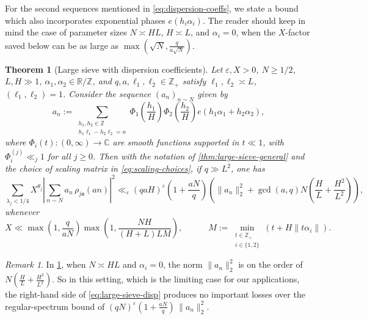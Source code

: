 \documentclass[reqno,11pt]{amsart}
\newtheorem{theorem}{Theorem}%
\theoremstyle{remark}
\newtheorem*{remark}{Remark}
\numberwithin{equation}{section}
\newcommand{\Z}{\mathbb{Z}}
\newcommand{\R}{\mathbb{R}}
\newcommand{\C}{\mathbb{C}}
\newcommand{\ma}{\mathfrak{a}}
\newcommand{\eps}{\varepsilon}
\begin{document}
For the second sequences mentioned in \cref{eq:dispersion-coeffs}, we state a bound which also incorporates exponential phases $e(h_i\alpha_i)$. The reader should keep in mind the case of parameter sizes $N \asymp HL$, $H \asymp L$, and $\alpha_i = 0$, when the $X$-factor saved below can be as large as $\max(\sqrt{N}, \tfrac{q}{a\sqrt{N}})$.




\begin{theorem}[Large sieve with dispersion coefficients] \label{thm:large-sieve-dispersion-coeffs}
Let $\eps, X > 0$, $N \ge 1/2$, $L, H \gg 1$, $\alpha_1, \alpha_2 \in \R/\Z$, and $q, a, \ell_1, \ell_2 \in \Z_+$ satisfy $\ell_1, \ell_2 \asymp L$, $(\ell_1, \ell_2) = 1$. Consider the sequence $(a_n)_{n \sim N}$ given by
\[
    a_n := \sum_{\substack{h_1, h_2 \in \Z \\ h_1 \ell_1 - h_2 \ell_2 = n}} \Phi_1\left(\frac{h_1}{H}\right) \Phi_2\left(\frac{h_2}{H}\right) e(h_1 \alpha_1 + h_2 \alpha_2),
\]
where $\Phi_i(t) : (0, \infty) \to \C$ are smooth functions supported in $t \ll 1$, with $\Phi_i^{(j)} \ll_j 1$ for all $j \ge 0$. Then with the notation of \cref{thm:large-sieve-general} and the choice of scaling matrix in \cref{eq:scaling-choices}, if $q \gg L^2$, one has
\begin{equation} \label{eq:large-sieve-disp}
    \sum_{\lambda_j < 1/4}
    X^{\theta_j} 
    \left\vert 
    \sum_{n \sim N} a_n\, \rho_{j\ma}(an)
    \right\vert^2 
    \ll_\eps 
    (qaH)^{\eps}
    \left(1 + \frac{aN}{q}\right)
    \left(\|a_n\|_2^2 + \gcd(a, q) N \left(\frac{H}{L} + \frac{H^2}{L^2}\right)\right),
\end{equation}
whenever 
\begin{equation} \label{eq:disp-X-range}
    X \ll \max\left(1, \frac{q}{aN}\right) \max\left(1, \frac{NH}{(H+L)LM}\right),
    \qquad\quad 
    M := \min_{\substack{t \in \Z_+ \\ i \in \{1, 2\}}} \left(t + H \|t\alpha_i\|\right).
\end{equation}
\end{theorem}

\begin{remark}
In \cref{thm:large-sieve-dispersion-coeffs}, when $N \asymp HL$ and $\alpha_i = 0$, the norm $\|a_n\|_2^2$ is on the order of $N(\frac{H}{L} + \frac{H^2}{L^2})$. So in this setting, which is the limiting case for our applications, the right-hand side of \cref{eq:large-sieve-disp} produces no important losses over the regular-spectrum bound of $(qN)^\eps (1 + \tfrac{aN}{q})\, \|a_n\|_2^2$.
\end{remark}
\end{document}
